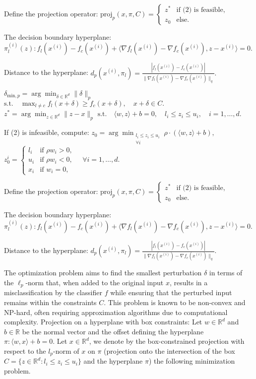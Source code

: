 Define the projection operator:
$\text{proj}_p(x, \pi, C) = \begin{cases} 
z^* & \text{if (2) is feasible}, \\
z_0 & \text{else}.
\end{cases}$

The decision boundary hyperplane:
$\pi_l^{(i)}(z) : f_l(x^{(i)}) - f_c(x^{(i)}) + \langle \nabla f_l(x^{(i)}) - \nabla f_c(x^{(i)}), z - x^{(i)} \rangle = 0.$

Distance to the hyperplane:
$d_p(x^{(i)}, \pi_l) = \frac{|f_l(x^{(i)}) - f_c(x^{(i)})|}{\|\nabla f_l(x^{(i)}) - \nabla f_c(x^{(i)})\|_q}.$


$\delta_{\text{min},p} = \arg \min_{\delta \in \mathbb{R}^d} \|\delta\|_p$
$\text{s.t.} \quad \max_{l \neq c} f_l(x + \delta) \geq f_c(x + \delta), \quad x + \delta \in C.$
$z^* = \arg \min_{z \in \mathbb{R}^d} \|z - x\|_p$
$\text{s.t.} \quad \langle w, z \rangle + b = 0, \quad l_i \leq z_i \leq u_i, \quad i = 1, \dots, d.$

If (2) is infeasible, compute:
$z_0 = \arg \min_{\substack{l_i \leq z_i \leq u_i \\ \forall i}} \rho \cdot (\langle w, z \rangle + b),$
$z_0^i = \begin{cases} 
l_i & \text{if } \rho w_i > 0, \\
u_i & \text{if } \rho w_i < 0, \\
x_i & \text{if } w_i = 0,
\end{cases}
\quad \forall i = 1, \dots, d.$

Define the projection operator:
$\text{proj}_p(x, \pi, C) = \begin{cases} 
z^* & \text{if (2) is feasible}, \\
z_0 & \text{else}.
\end{cases}$

The decision boundary hyperplane:
$\pi_l^{(i)}(z) : f_l(x^{(i)}) - f_c(x^{(i)}) + \langle \nabla f_l(x^{(i)}) - \nabla f_c(x^{(i)}), z - x^{(i)} \rangle = 0.$

Distance to the hyperplane:
$d_p(x^{(i)}, \pi_l) = \frac{|f_l(x^{(i)}) - f_c(x^{(i)})|}{\|\nabla f_l(x^{(i)}) - \nabla f_c(x^{(i)})\|_q}.$


The optimization problem aims to find the smallest perturbation $\delta$ in terms of the $\ell_p$-norm that, when added to the original input $x$, results in a misclassification by the classifier $f$ while ensuring that the perturbed input remains within the constraints $C$. This problem is known to be non-convex and NP-hard, often requiring approximation algorithms due to computational complexity.
Projection on a hyperplane with box constraints: Let $w \in \mathbb{R}^d$ and $b \in \mathbb{R}$ be the normal vector and the offset defining the hyperplane $\pi : \langle w, x \rangle + b = 0$. Let $x \in \mathbb{R}^d$, we denote by the box-constrained projection with respect to the $l_p$-norm of $x$ on $\pi$ (projection onto the intersection of the box $C = \{ z \in \mathbb{R}^d : l_i \leq z_i \leq u_i \}$ and the hyperplane $\pi$) the following minimization problem.

